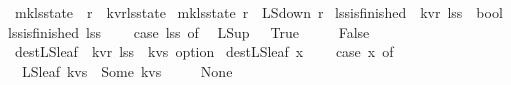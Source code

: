 \begin{isabellebody}
\isanewline
{}\isamarkupfalse%
\ mk{\isacharunderscore}ls{\isacharunderscore}state\ {\isacharcolon}{\isacharcolon}\ {\isachardoublequoteopen}{\isacharprime}r\ {\isasymRightarrow}\ {\isacharparenleft}{\isacharprime}k{\isacharcomma}{\isacharprime}v{\isacharcomma}{\isacharprime}r{\isacharparenright}ls{\isacharunderscore}state{\isachardoublequoteclose}\ \isanewline
{\isachardoublequoteopen}mk{\isacharunderscore}ls{\isacharunderscore}state\ r\ {\isacharequal}\ LS{\isacharunderscore}down\ {\isacharparenleft}r{\isacharcomma}{\isacharbrackleft}{\isacharbrackright}{\isacharparenright}{\isachardoublequoteclose}\isanewline
\isanewline
\isanewline
{}\isamarkupfalse%
\ lss{\isacharunderscore}is{\isacharunderscore}finished\ {\isacharcolon}{\isacharcolon}\ {\isachardoublequoteopen}{\isacharparenleft}{\isacharprime}k{\isacharcomma}{\isacharprime}v{\isacharcomma}{\isacharprime}r{\isacharparenright}\ lss\ {\isasymRightarrow}\ bool{\isachardoublequoteclose}\ \isanewline
{\isachardoublequoteopen}lss{\isacharunderscore}is{\isacharunderscore}finished\ lss\ {\isacharequal}\ {\isacharparenleft}\isanewline
\ \ case\ lss\ of\isanewline
\ \ LS{\isacharunderscore}up\ {\isacharbrackleft}{\isacharbrackright}\ {\isasymRightarrow}\ True\isanewline
\ \ {\isacharbar}\ {\isacharunderscore}\ {\isasymRightarrow}\ False{\isacharparenright}{\isachardoublequoteclose}\isanewline
\isanewline
\isanewline
{}\isamarkupfalse%
\ dest{\isacharunderscore}LS{\isacharunderscore}leaf\ {\isacharcolon}{\isacharcolon}\ {\isachardoublequoteopen}{\isacharparenleft}{\isacharprime}k{\isacharcomma}{\isacharprime}v{\isacharcomma}{\isacharprime}r{\isacharparenright}\ lss\ {\isasymRightarrow}\ {\isacharparenleft}{\isacharprime}k{\isacharasterisk}{\isacharprime}v{\isacharparenright}s\ option{\isachardoublequoteclose}\ \isanewline
{\isachardoublequoteopen}dest{\isacharunderscore}LS{\isacharunderscore}leaf\ x\ {\isacharequal}\ {\isacharparenleft}\isanewline
\ \ case\ x\ of\ \isanewline
\ \ LS{\isacharunderscore}leaf\ {\isacharparenleft}kvs{\isacharcomma}{\isacharunderscore}{\isacharparenright}\ {\isasymRightarrow}\ Some\ kvs\isanewline
\ \ {\isacharbar}\ {\isacharunderscore}\ {\isasymRightarrow}\ None\isanewline
{\isacharparenright}{\isachardoublequoteclose}\isanewline
%
\isadelimtheory
\isanewline
%
\endisadelimtheory
%
\isatagtheory
{}\isamarkupfalse%
%
\endisatagtheory
{\isafoldtheory}%
%
\isadelimtheory
%
\endisadelimtheory
\end{isabellebody}%
